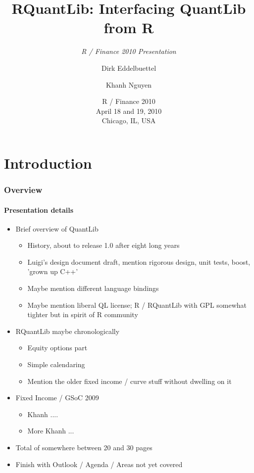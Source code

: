 \documentclass[smaller,compress, 9pt]{beamer}
\title[RQuantLib]{RQuantLib: Interfacing QuantLib from R}  %
\subtitle{\textsl{R / Finance 2010 Presentation}}
\author[Eddelbuettel \and Nguyen]{Dirk Eddelbuettel\inst{1} \and Khanh Nguyen\inst{2}}
\institute[Debian and UMASS]{
  \inst{1}%
  Debian Project
  \and 
  \inst{2}
  UMASS at Boston
}
\date[R / Finance 2010]{R / Finance 2010 \\ April 18 and 19, 2010 \\ Chicago, IL, USA}
\begin{document}
\begin{frame}
  \titlepage
\end{frame}

\section{Introduction}
\begin{frame}
  \frametitle{Overview}
  \framesubtitle{Presentation details}
  \begin{itemize}
  \item Brief overview of QuantLib
    \begin{itemize}
    \item History, about to release 1.0 after eight long years
    \item Luigi's design document draft, mention rigorous design, unit
      tests, boost, 'grown up C++'
    \item Maybe mention different language bindings
    \item Maybe mention liberal QL license; R / RQuantLib with GPL somewhat
      tighter but in spirit of R community
    \end{itemize}
  \item RQuantLib maybe chronologically
    \begin{itemize}
    \item Equity options part
    \item Simple calendaring
    \item Mention the older fixed income / curve stuff without dwelling on it
    \end{itemize}
  \item Fixed Income / GSoC 2009
    \begin{itemize}
    \item Khanh ....
    \item More Khanh ...
    \end{itemize}
  \item Total of somewhere between 20 and 30 pages
  \item Finish with Outlook / Agenda / Areas not yet covered
  \end{itemize}
\end{frame}
\end{document}
